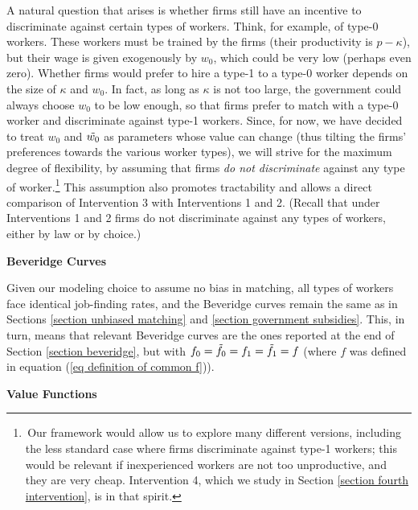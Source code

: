 \documentclass[12pt]{article} %
\theoremstyle{definition}
\begin{document}
A natural question that arises is whether firms still have an incentive to discriminate against certain types of workers. Think, for example, of type-0 workers. These workers must be trained by the firms (their productivity is $p-\kappa$), but their wage is given exogenously by $w_0$, which could be very low (perhaps even zero). Whether firms would prefer to hire a type-1 to a type-0 worker depends on the size of $\kappa$ and $w_0$. In fact, as long as $\kappa$ is not too large, the government could always choose $w_0$ to be low enough, so that firms prefer to match with a type-0 worker and discriminate against type-1 workers. Since, for now, we have decided to treat $w_0$ and $\Tilde{w_0}$ as parameters whose value can change (thus tilting the firms' preferences towards the various worker types), we will strive for the maximum degree of flexibility, by assuming that firms \textit{do not discriminate} against any type of worker.\footnote{\,Our framework would allow us to explore many different versions, including the less standard case where firms discriminate against type-1 workers; this would be relevant if inexperienced workers are not too unproductive, and they are very cheap. Intervention 4, which we study in Section \ref{section fourth intervention}, is in that spirit.} This assumption also promotes tractability and allows a direct comparison of Intervention 3 with Interventions 1 and 2. (Recall that under Interventions 1 and 2 firms do not discriminate against any types of workers, either by law or by choice.)  

\bigskip 

\noindent \textbf{Beveridge Curves} 

\noindent Given our modeling choice to assume no bias in matching, all types of workers face identical job-finding rates, and the Beveridge curves remain the same as in Sections \ref{section unbiased matching} and \ref{section government subsidies}. This, in turn, means that relevant Beveridge curves are the ones reported at the end of Section \ref{section beveridge}, but with $f_0=\Tilde{f_0}=f_1=\Tilde{f_1}=f$ (where $f$ was defined in equation (\ref{eq definition of common f})). 

\bigskip 

\noindent \textbf{Value Functions}
\end{document}
